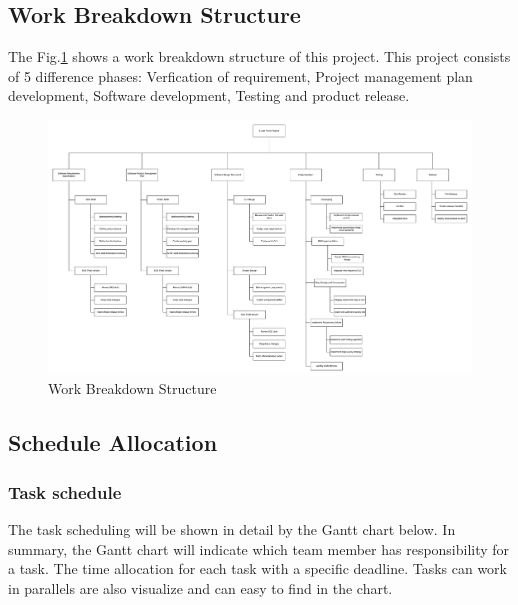 	\subsection{Work Breakdown Structure}
The Fig.\ref{work-breakdown-structure} shows a work breakdown structure of this project. This project consists of 5 difference phases: Verfication of requirement, Project management plan development, Software development, Testing and product release. 
	\begin{figure}[H]
		\centering
		\hspace*{-1.3in}
		\includegraphics[width=1.5\linewidth]{WorkBreakDown_s.png}  %
		\caption{Work Breakdown Structure}
		\label{work-breakdown-structure}
	\end{figure}
\subsection{Schedule Allocation}
\subsubsection{Task schedule}
The task scheduling will be shown in detail by the Gantt chart below. In summary, the Gantt chart will indicate which team member has responsibility for a task. The time allocation for each task with a specific  deadline. Tasks can work in parallels are also visualize and can easy to find in the chart.     
